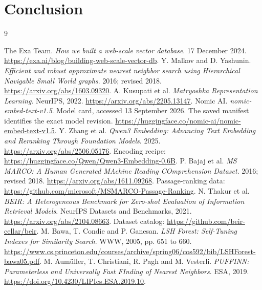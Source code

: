 \section{Conclusion}


\begin{thebibliography}{9}\small\raggedright
{}
 The Exa Team. \emph{How we built a web-scale vector database}. 17 December 2024.
\url{https://exa.ai/blog/building-web-scale-vector-db}.
 Y. Malkov and D. Yashunin. \emph{Efficient and robust approximate nearest neighbor search using Hierarchical Navigable Small World graphs}. 2016; revised 2018.
\url{https://arxiv.org/abs/1603.09320}.
 A. Kusupati et al. \emph{Matryoshka Representation Learning}. NeurIPS, 2022.
\url{https://arxiv.org/abs/2205.13147}.
 Nomic AI. \emph{nomic-embed-text-v1.5}. Model card, accessed 13 September 2026. The saved manifest identifies the exact model revision.
\url{https://huggingface.co/nomic-ai/nomic-embed-text-v1.5}.
 Y. Zhang et al. \emph{Qwen3 Embedding: Advancing Text Embedding and Reranking Through Foundation Models}. 2025.
\url{https://arxiv.org/abs/2506.05176}. Encoding recipe: \url{https://huggingface.co/Qwen/Qwen3-Embedding-0.6B}.
 P. Bajaj et al. \emph{MS MARCO: A Human Generated MAchine Reading COmprehension Dataset}. 2016; revised 2018.
\url{https://arxiv.org/abs/1611.09268}. Passage-ranking data: \url{https://github.com/microsoft/MSMARCO-Passage-Ranking}.
 N. Thakur et al. \emph{BEIR: A Heterogeneous Benchmark for Zero-shot Evaluation of Information Retrieval Models}. NeurIPS Datasets and Benchmarks, 2021.
\url{https://arxiv.org/abs/2104.08663}. Dataset catalog: \url{https://github.com/beir-cellar/beir}.
 M. Bawa, T. Condie and P. Ganesan. \emph{LSH Forest: Self-Tuning Indexes for Similarity Search}. WWW, 2005, pp. 651 to 660.
\url{https://www.cs.princeton.edu/courses/archive/spring06/cos592/bib/LSHForest-bawa05.pdf}.
 M. Aum\"uller, T. Christiani, R. Pagh and M. Vesterli. \emph{PUFFINN: Parameterless and Universally Fast FInding of Nearest Neighbors}. ESA, 2019.
\url{https://doi.org/10.4230/LIPIcs.ESA.2019.10}.
\end{thebibliography}
